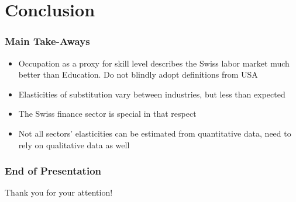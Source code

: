 \documentclass[11pt]{beamer} \usetheme{Frankfurt}
\begin{document}
\section{Conclusion}

\begin{frame}
  \frametitle{Main Take-Aways}
  \begin{itemize}
  \item Occupation as a proxy for skill level describes the Swiss
    labor market much better than Education. Do not blindly adopt
    definitions from USA 
  \item Elasticities of substitution vary between industries, but less
    than expected
  \item The Swiss finance sector is special in that respect
  \item Not all sectors' elasticities can be estimated from
    quantitative data, need to rely on qualitative data as well
  \end{itemize}
\end{frame}

\begin{frame}
  \frametitle{End of Presentation}
  Thank you for your attention!
\end{frame}
\end{document}
